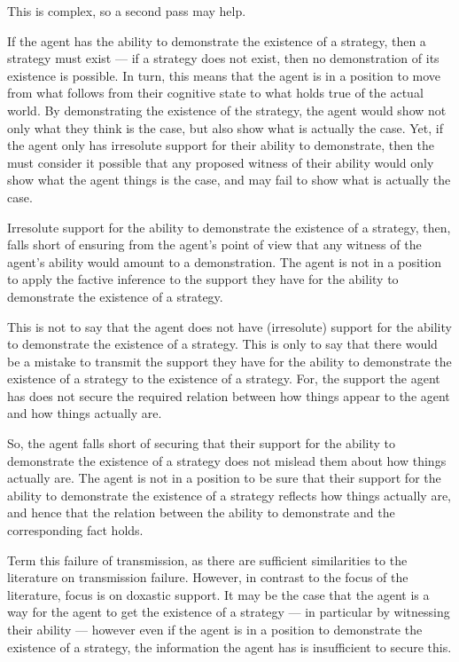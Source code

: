 \documentclass[10pt]{article}
\begin{document}
\begin{note}
  This is complex, so a second pass may help.

  If the agent has the ability to demonstrate the existence of a strategy, then a strategy must exist --- if a strategy does not exist, then no demonstration of its existence is possible.
  In turn, this means that the agent is in a position to move from what follows from their cognitive state to what holds true of the actual world.
  By demonstrating the existence of the strategy, the agent would show not only what they think is the case, but also show what is actually the case.
  Yet, if the agent only has irresolute support for their ability to demonstrate, then the must consider it possible that any proposed witness of their ability would only show what the agent things is the case, and may fail to show what is actually the case.

  Irresolute support for the ability to demonstrate the existence of a strategy, then, falls short of ensuring from the agent's point of view that any witness of the agent's ability would amount to a demonstration.
  The agent is not in a position to apply the factive inference to the support they have for the ability to demonstrate the existence of a strategy.

  This is not to say that the agent does not have (irresolute) support for the ability to demonstrate the existence of a strategy.
  This is only to say that there would be a mistake to transmit the support they have for the ability to demonstrate the existence of a strategy to the existence of a strategy.
  For, the support the agent has does not secure the required relation between how things appear to the agent and how things actually are.

  So, the agent falls short of securing that their support for the ability to demonstrate the existence of a strategy does not mislead them about how things actually are.
  The agent is not in a position to be sure that their support for the ability to demonstrate the existence of a strategy reflects how things actually are, and hence that the relation between the ability to demonstrate and the corresponding fact holds.
\end{note}

\begin{note}
  Term this failure of transmission, as there are sufficient similarities to the literature on transmission failure.
  However, in contrast to the focus of the literature, focus is on doxastic support.
  It may be the case that the agent is a way for the agent to get the existence of a strategy --- in particular by witnessing their ability --- however even if the agent is in a position to demonstrate the existence of a strategy, the information the agent has is insufficient to secure this.
\end{note}
\end{document}
